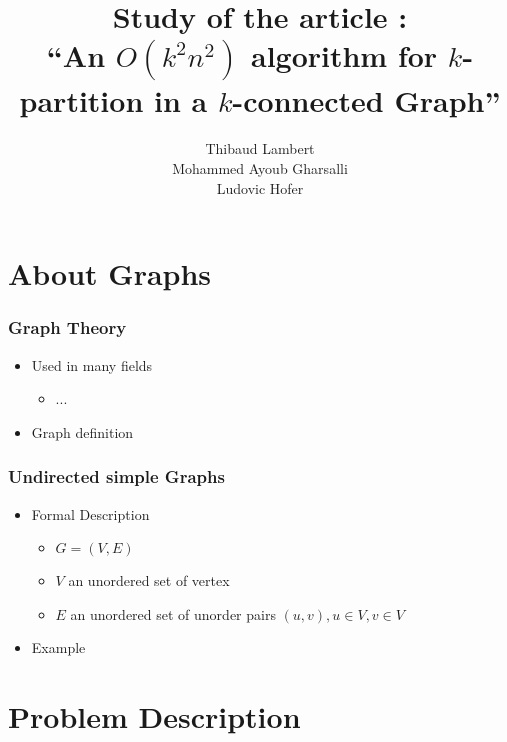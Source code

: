 \documentclass[xcolor=dvipsnames]{beamer}
\title[$O(k^2n^2)$ algorithm for $k$-partitionning]{Study of the article :\\``An $O(k^2n^2)$ algorithm for $k$-partition in a $k$-connected Graph''}
\author[Lambert, Gharsalli, Hofer]
       {Thibaud Lambert\\Mohammed Ayoub Gharsalli\\Ludovic Hofer}
\institute{University of Bordeaux}
\begin{document}
\begin{frame}[plain]
  \maketitle
\end{frame}

\begin{frame}[plain]
  \tableofcontents
\end{frame}

\section{About Graphs}

\begin{frame}
  \frametitle{Graph Theory}
  \begin{itemize}
  \item Used in many fields
    \begin{itemize}
    \item ...
    \end{itemize}
  \item Graph definition
  \end{itemize}
\end{frame}

\begin{frame}
  \frametitle{Undirected simple Graphs}
  \begin{itemize}
    \item Formal Description
      \begin{itemize}
      \item $G = (V,E)$
      \item $V$ an unordered set of vertex
      \item $E$ an unordered set of unorder pairs $(u,v), u \in V, v \in V$
      \end{itemize}
    \item Example
  \end{itemize}
\end{frame}

\section{Problem Description}
\end{document}
